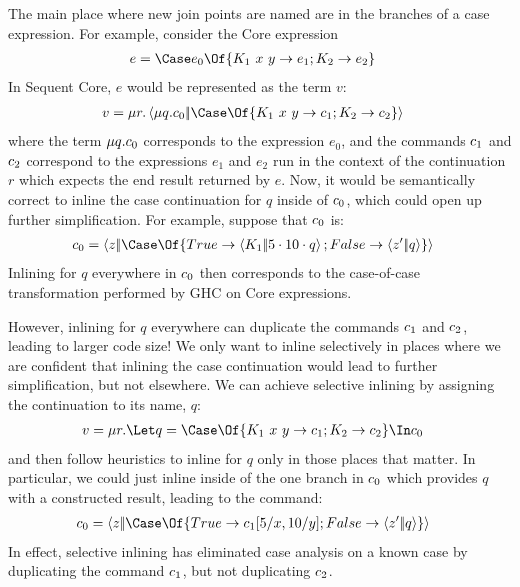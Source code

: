 \documentclass{article}
\begin{document}
The main place where new join points are named are in the branches of a case
expression.  For example, consider the Core expression
\begin{align*}
  e &= \Case e_0 \Of \{ K_1 ~ x ~ y \to e_1; K_2 \to e_2 \}
\end{align*}
In Sequent Core, $e$ would be represented as the term $v$:
\begin{align*}
  v
  &=
  \comp{r}
    \cut
    {\comp{q}\com_0}
    {\Case\Of \{ K_1 ~ x ~ y \to \com_1; K_2 \to \com_2 \}}
\end{align*}
where the term $\mu{q}.c_0$ corresponds to the expression $e_0$, and the
commands $c_1$ and $c_2$ correspond to the expressions $e_1$ and $e_2$ run
in the context of the continuation $r$ which expects the end result returned by
$e$.  Now, it would be semantically correct to inline the case continuation for
$q$ inside of $c_0$, which could open up further simplification.  For
example, suppose that $c_0$ is:
\begin{align*}
  \com_0
  &=
  \cut{z}{\Case\Of \{ True \to \cut{K_1}{\app{5}{\app{10}{q}}}; False \to \cut{z'}{q} \}}
\end{align*}
Inlining for $q$ everywhere in $c_0$ then corresponds to the case-of-case
transformation performed by GHC on Core expressions.

However, inlining for $q$ everywhere can duplicate the commands $c_1$ and
$c_2$, leading to larger code size!  We only want to inline selectively in
places where we are confident that inlining the case continuation would lead to
further simplification, but not elsewhere.  We can achieve selective inlining by
assigning the continuation to its name, $q$:
\begin{align*}
  v
  &=
  \comp{r}
  \Let q = \Case\Of \{ K_1 ~ x ~ y \to \com_1; K_2 \to \com_2 \}
  \In \com_0
\end{align*}
and then follow heuristics to inline for $q$ only in those places that matter.
In particular, we could just inline inside of the one branch in $c_0$ which
provides $q$ with a constructed result, leading to the command:
\begin{align*}
  \com_0
  &=
  \cut{z}{\Case\Of \{ True \to \com_1[5/x,10/y]; False \to \cut{z'}{q} \}}
\end{align*}
In effect, selective inlining has eliminated case analysis on a known case by
duplicating the command $c_1$, but not duplicating $c_2$.
\end{document}
